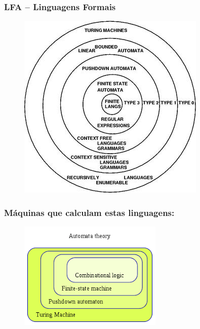 \documentclass[10pt]{beamer}
\begin{document}












\begin{frame}[fragile]
\frametitle{LFA -- Linguagens  Formais}
\begin{figure}[!ht]
	\centering
	\includegraphics[height =.6\textheight,width=.5\textwidth]
	{figuras/Chomsky_Venn.jpg}
\end{figure}

\end{frame}


\begin{frame}[fragile]
\frametitle{Máquinas que calculam estas linguagens: }
\begin{figure}[!ht]
	\centering
	\includegraphics[height =.6\textheight,width=.6\textwidth]
	{figuras/circuitos_a_MT.png}
\end{figure}

\end{frame}
\end{document}

